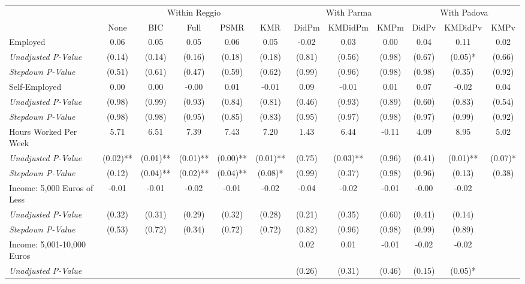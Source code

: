 \begin{tabular}{l c c c c c c c c c c c}
\toprule
& \multicolumn{5}{c}{Within Reggio} & \multicolumn{3}{c}{With Parma} & \multicolumn{3}{c}{With Padova} \\\cmidrule(lr){2-6} \cmidrule(lr){7-9} \cmidrule(lr){10-12}
 & None & BIC & Full & PSMR & KMR & DidPm & KMDidPm & KMPm & DidPv & KMDidPv & KMPv \\
\midrule
Employed & 0.06 & 0.05 & 0.05 & 0.06 & 0.05 & -0.02 & 0.03 & 0.00 & 0.04 & 0.11 & 0.02 \\
\quad \textit{Unadjusted P-Value} & (0.14) & (0.14) & (0.16) & (0.18) & (0.18) & (0.81) & (0.56) & (0.98) & (0.67) & (0.05)* & (0.66) \\
\quad \textit{Stepdown P-Value} & (0.51) & (0.61) & (0.47) & (0.59) & (0.62) & (0.99) & (0.96) & (0.98) & (0.98) & (0.35) & (0.92) \\
Self-Employed & 0.00 & 0.00 & -0.00 & 0.01 & -0.01 & 0.09 & -0.01 & 0.01 & 0.07 & -0.02 & 0.04 \\
\quad \textit{Unadjusted P-Value} & (0.98) & (0.99) & (0.93) & (0.84) & (0.81) & (0.46) & (0.93) & (0.89) & (0.60) & (0.83) & (0.54) \\
\quad \textit{Stepdown P-Value} & (0.98) & (0.98) & (0.95) & (0.85) & (0.83) & (0.95) & (0.97) & (0.98) & (0.97) & (0.99) & (0.92) \\
Hours Worked Per Week & 5.71 & 6.51 & 7.39 & 7.43 & 7.20 & 1.43 & 6.44 & -0.11 & 4.09 & 8.95 & 5.02 \\
\quad \textit{Unadjusted P-Value} & (0.02)** & (0.01)** & (0.01)** & (0.00)** & (0.01)** & (0.75) & (0.03)** & (0.96) & (0.41) & (0.01)** & (0.07)* \\
\quad \textit{Stepdown P-Value} & (0.12) & (0.04)** & (0.02)** & (0.04)** & (0.08)* & (0.99) & (0.37) & (0.98) & (0.96) & (0.13) & (0.38) \\
Income: 5,000 Euros of Less & -0.01 & -0.01 & -0.02 & -0.01 & -0.02 & -0.04 & -0.02 & -0.01 & -0.00 & -0.02 &  \\
\quad \textit{Unadjusted P-Value} & (0.32) & (0.31) & (0.29) & (0.32) & (0.28) & (0.21) & (0.35) & (0.60) & (0.41) & (0.14) & \\
\quad \textit{Stepdown P-Value} & (0.53) & (0.72) & (0.34) & (0.72) & (0.72) & (0.82) & (0.96) & (0.98) & (0.99) & (0.89) &  \\
Income: 5,001-10,000 Euros &  &  &  &  &  & 0.02 & 0.01 & -0.01 & -0.02 & -0.02 &  \\
\quad \textit{Unadjusted P-Value} & & & & & & (0.26) & (0.31) & (0.46) & (0.15) & (0.05)* & \\

\end{tabular}
